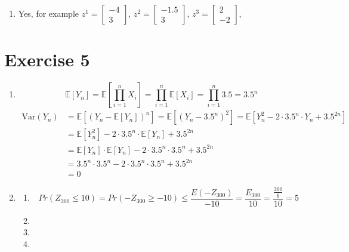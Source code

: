 \documentclass[12pt]{article}
\begin{document}
\begin{enumerate}[label=(\alph*)]
	\item	Yes, for example
			$z^1=\begin{bmatrix} -4 \\ 3 \end{bmatrix}$,
			$z^2=\begin{bmatrix} -1.5 \\ 3 \end{bmatrix}$,
			$z^3=\begin{bmatrix} 2 \\ -2 \end{bmatrix}$,
\end{enumerate}

\section*{Exercise 5}
\begin{enumerate}[label=(\alph*)]
	\item	\[\mathbb{E}[Y_n] = \mathbb{E}[\prod_{i=1}^n X_i] = \prod_{i=1}^n \mathbb{E}[X_i] = \prod_{i=1}^n 3.5 = 3.5^n\]
			\begin{align*}
				\text{Var}(Y_n) &= \mathbb{E}[(Y_n - \mathbb{E}[Y_n])^n] = \mathbb{E}[(Y_n - 3.5^n)^2] = \mathbb{E}[Y_n^2 - 2 \cdot 3.5^n \cdot Y_n + 3.5^{2n}] \\
				&= \mathbb{E}[Y_n^2] - 2 \cdot 3.5^n \cdot \mathbb{E}[Y_n] + 3.5^{2n} \\
				&= \mathbb{E}[Y_n] \cdot \mathbb{E}[Y_n] - 2 \cdot 3.5^n \cdot 3.5^n + 3.5^{2n} \\
				&= 3.5^n \cdot 3.5^n - 2 \cdot 3.5^n \cdot 3.5^n + 3.5^{2n} \\
				&= 0
			\end{align*}
	\item	\begin{enumerate}[label=(\roman*)]
				\item	\[Pr(Z_{300} \leq 10) = Pr(-Z_{300} \geq -10) \leq \frac{E(-Z_{300})}{-10} = \frac{E_{300}}{10} = \frac{\frac{300}{6}}{10} = 5\]
				\item
				\item
				\item
			\end{enumerate}
\end{enumerate}
\end{document}
